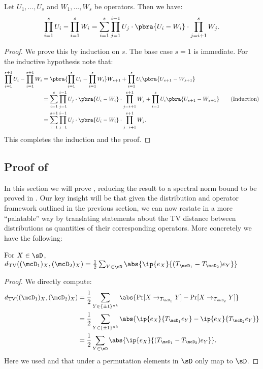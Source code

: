 \begin{fact}
    \label{fact:differenceofproducts}
    Let $U_1, ..., U_s$ and $W_1,..., W_s$ be operators. Then we have:
    \begin{equation*}
        \prod_{i= 1}^s U_i - \prod_{i=1}^s W_i = \sum_{i=1}^s \prod_{j=1}^{i-1} U_j \cdot \pbra{U_i - W_i} \cdot \prod_{j = i+1}^s W_j.
    \end{equation*}
\end{fact}
\begin{proof}
We prove this by induction on $s$. The base case $s=1$ is immediate. For the inductive hypothesis note that:
\begin{align*}
    \prod_{i= 1}^{s+1} U_i - \prod_{i=1}^{s+1} W_i &= \pbra{\prod_{i= 1}^s U_i - \prod_{i=1}^s W_i}W_{s+1} + \prod_{i=1}^s U_i \pbra{U_{s+1} - W_{s+1}}\\
    &= \sum_{i=1}^s \prod_{j=1}^{i-1} U_j \cdot \pbra{U_i - W_i} \cdot \prod_{j = i+1}^{s+1} W_j + \prod_{i=1}^s U_i \pbra{U_{s+1} - W_{s+1}} \tag{Induction}\\
    &= \sum_{i=1}^{s+1} \prod_{j=1}^{i-1} U_j \cdot \pbra{U_i - W_i} \cdot \prod_{j = i+1}^{s+1} W_j.
\end{align*}
This completes the induction and the proof.
\end{proof}



\subsection{Proof of }
\label{sec:2D to 1D proof}

In this section we will prove , reducing the result to a spectral norm bound to be proved in . Our key insight will be that given the distribution and operator framework outlined in the previous section, we can now restate  in a more ``palatable'' way by translating statements about the TV distance between distributions as quantities of their corresponding operators. More concretely we have the following:
\begin{claim}
    \label{tvdistancetolinearform}
    For $X \in \sD$, $d_{\mathrm{TV}}((\mcD_1)_X, (\mcD_2)_X) = \frac{1}{2} \sum_{Y \in \sD} \abs{\ip{e_X}{(T_{\mcD_1}-T_{\mcD_2}) e_Y}}$
\end{claim}

\begin{proof}We directly compute:
    \begin{align*}
        d_{\textrm{TV}}((\mcD_1)_X, (\mcD_2)_X) 
        &= \frac{1}{2} \sum_{Y \in \{\pm1\}^{nk}} \abs{\Pr[X \to_{T_{\mcD_1}} Y] - \Pr[X \to_{T_{\mcD_2}} Y]}\\
        &= \frac{1}{2} \sum_{Y \in \{\pm1\}^{nk}} \abs{\ip{e_X}{T_{\mcD_1} e_Y} - \ip{e_X}{T_{\mcD_2} e_Y}}\\
        &= \frac{1}{2} \sum_{Y \in \sD} \abs{\ip{e_X}{(T_{\mcD_1}-T_{\mcD_2}) e_Y}}.
    \end{align*}
    Here we used  and that under a permutation elements in $\sD$ only map to $\sD$. 
\end{proof}

